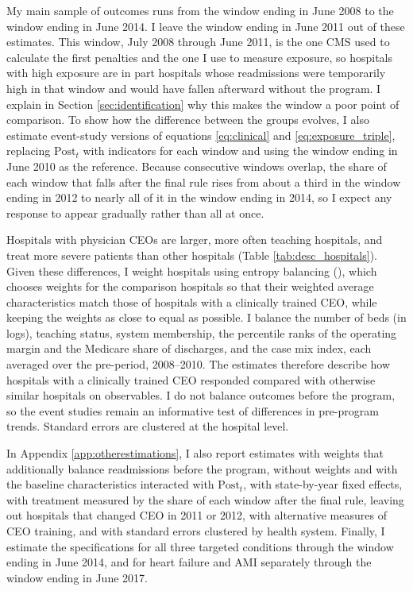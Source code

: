 \documentclass[12pt]{article}
\theoremstyle{definition}   %
\begin{document}
My main sample of outcomes runs from the window ending in June 2008 to the window ending in June 2014. I leave the window ending in June 2011 out of these estimates. This window, July 2008 through June 2011, is the one CMS used to calculate the first penalties and the one I use to measure exposure, so hospitals with high exposure are in part hospitals whose readmissions were temporarily high in that window and would have fallen afterward without the program. I explain in Section \ref{sec:identification} why this makes the window a poor point of comparison. To show how the difference between the groups evolves, I also estimate event-study versions of equations \eqref{eq:clinical} and \eqref{eq:exposure_triple}, replacing $\text{Post}_t$ with indicators for each window and using the window ending in June 2010 as the reference. Because consecutive windows overlap, the share of each window that falls after the final rule rises from about a third in the window ending in 2012 to nearly all of it in the window ending in 2014, so I expect any response to appear gradually rather than all at once.

Hospitals with physician CEOs are larger, more often teaching hospitals, and treat more severe patients than other hospitals (Table \ref{tab:desc_hospitals}). Given these differences, I weight hospitals using entropy balancing (\cite{hainmueller2012entropy}), which chooses weights for the comparison hospitals so that their weighted average characteristics match those of hospitals with a clinically trained CEO, while keeping the weights as close to equal as possible. I balance the number of beds (in logs), teaching status, system membership, the percentile ranks of the operating margin and the Medicare share of discharges, and the case mix index, each averaged over the pre-period, 2008--2010. The estimates therefore describe how hospitals with a clinically trained CEO responded compared with otherwise similar hospitals on observables. I do not balance outcomes before the program, so the event studies remain an informative test of differences in pre-program trends. Standard errors are clustered at the hospital level.

In Appendix \ref{app:otherestimations}, I also report estimates with weights that additionally balance readmissions before the program, without weights and with the baseline characteristics interacted with $\text{Post}_t$, with state-by-year fixed effects, with treatment measured by the share of each window after the final rule, leaving out hospitals that changed CEO in 2011 or 2012, with alternative measures of CEO training, and with standard errors clustered by health system. Finally, I estimate the specifications for all three targeted conditions through the window ending in June 2014, and for heart failure and AMI separately through the window ending in June 2017.
\end{document}
